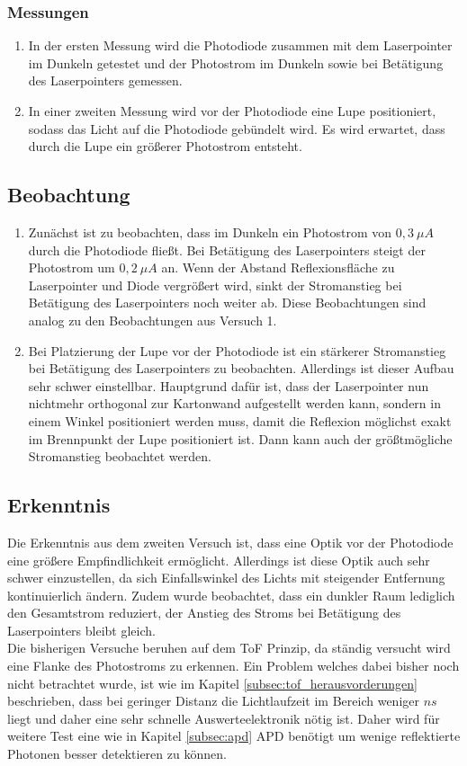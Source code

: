 \subsubsection{Messungen}
\begin{enumerate}
	\item In der ersten Messung wird die Photodiode zusammen mit dem Laserpointer im Dunkeln getestet und der Photostrom im Dunkeln sowie bei Betätigung des Laserpointers gemessen.
	\item In einer zweiten Messung wird vor der Photodiode eine Lupe positioniert, sodass das Licht auf die Photodiode gebündelt wird. Es wird erwartet, dass durch die Lupe ein größerer Photostrom entsteht.
\end{enumerate}
\subsection{Beobachtung}
\begin{enumerate}
	\item Zunächst ist zu beobachten, dass im Dunkeln ein Photostrom von $0,3\:\mu A$ durch die Photodiode fließt. Bei Betätigung des Laserpointers steigt der Photostrom um $0,2\:\mu A$ an. Wenn der Abstand Reflexionsfläche zu Laserpointer und Diode vergrößert wird, sinkt der Stromanstieg bei Betätigung des Laserpointers noch weiter ab. Diese Beobachtungen sind analog zu den Beobachtungen aus Versuch 1.
	\item Bei Platzierung der Lupe vor der Photodiode ist ein stärkerer Stromanstieg bei Betätigung des Laserpointers zu beobachten. Allerdings ist dieser Aufbau sehr schwer einstellbar. Hauptgrund dafür ist, dass der Laserpointer nun nichtmehr orthogonal zur Kartonwand aufgestellt werden kann, sondern in einem Winkel positioniert werden muss, damit die Reflexion möglichst exakt im Brennpunkt der Lupe positioniert ist. Dann kann auch der größtmögliche Stromanstieg beobachtet werden. 
\end{enumerate}
\subsection{Erkenntnis}
Die Erkenntnis aus dem zweiten Versuch ist, dass eine Optik vor der Photodiode eine größere Empfindlichkeit ermöglicht. Allerdings ist diese Optik auch sehr schwer einzustellen, da sich Einfallswinkel des Lichts mit steigender Entfernung kontinuierlich ändern. Zudem wurde beobachtet, dass ein dunkler Raum lediglich den Gesamtstrom reduziert, der Anstieg des Stroms bei Betätigung des Laserpointers bleibt gleich.\\
Die bisherigen Versuche beruhen auf dem \ac{ToF} Prinzip, da ständig versucht wird eine Flanke des Photostroms zu erkennen. Ein Problem welches dabei bisher noch nicht betrachtet wurde, ist wie im Kapitel \ref{subsec:tof_herausvorderungen} beschrieben, dass bei geringer Distanz die Lichtlaufzeit im Bereich weniger $ns$ liegt und daher eine sehr schnelle Auswerteelektronik nötig ist. Daher wird für weitere Test eine wie in Kapitel \ref{subsec:apd} \ac{APD} benötigt um wenige reflektierte Photonen besser detektieren zu können.
